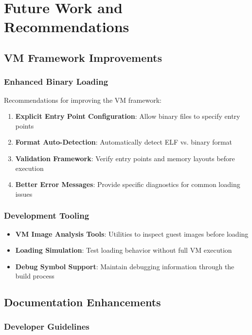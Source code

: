 \documentclass[11pt,a4paper]{article}
\begin{document}
\section{Future Work and Recommendations}

\subsection{VM Framework Improvements}

\subsubsection{Enhanced Binary Loading}

Recommendations for improving the VM framework:

\begin{enumerate}
\item \textbf{Explicit Entry Point Configuration}: Allow binary files to specify entry points
\item \textbf{Format Auto-Detection}: Automatically detect ELF vs. binary format
\item \textbf{Validation Framework}: Verify entry points and memory layouts before execution
\item \textbf{Better Error Messages}: Provide specific diagnostics for common loading issues
\end{enumerate}

\subsubsection{Development Tooling}

\begin{itemize}
\item \textbf{VM Image Analysis Tools}: Utilities to inspect guest images before loading
\item \textbf{Loading Simulation}: Test loading behavior without full VM execution
\item \textbf{Debug Symbol Support}: Maintain debugging information through the build process
\end{itemize}

\subsection{Documentation Enhancements}

\subsubsection{Developer Guidelines}
\end{document}
